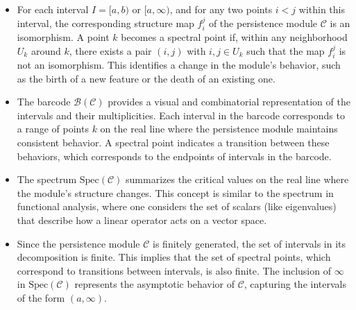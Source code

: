 \begin{remark}\noindent
\begin{itemize}
    \item For each interval $I = [a,b)$ or $[a,\infty)$, and for any two points $i < j$ within this interval, the corresponding structure map $f_{i}^j$ of the persistence module $\mathcal{C}$ is an isomorphism. A point $k$ becomes a spectral point if, within any neighborhood $U_k$ around $k$, there exists a pair $(i, j)$ with $i,j \in U_k$ such that the map $f_{i}^j$ is not an isomorphism. This identifies a change in the module's behavior, such as the birth of a new feature or the death of an existing one.
    \item The barcode $\mathcal{B}(\mathcal{C})$ provides a visual and combinatorial representation of the intervals and their multiplicities. Each interval in the barcode corresponds to a range of points $k$ on the real line where the persistence module maintains consistent behavior. A spectral point indicates a transition between these behaviors, which corresponds to the endpoints of intervals in the barcode.
    \item The spectrum $\text{Spec}(\mathcal{C})$ summarizes the critical values on the real line where the module's structure changes. This concept is similar to the spectrum in functional analysis, where one considers the set of scalars (like eigenvalues) that describe how a linear operator acts on a vector space.
    \item Since the persistence module $\mathcal{C}$ is finitely generated, the set of intervals in its decomposition is finite. This implies that the set of spectral points, which correspond to transitions between intervals, is also finite. The inclusion of $\infty$ in $\text{Spec}(\mathcal{C})$ represents the asymptotic behavior of $\mathcal{C}$, capturing the intervals of the form $(a, \infty)$.
\end{itemize}
\end{remark}

